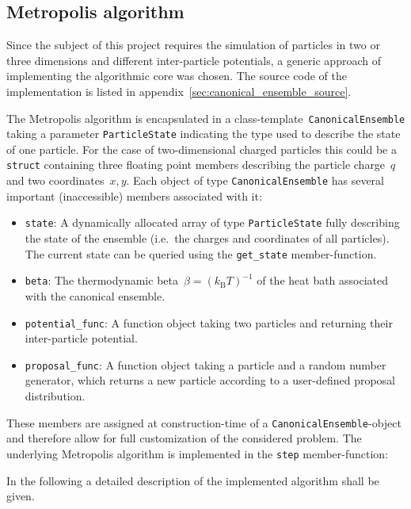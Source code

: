 \documentclass[11pt, a4paper]{article}
\numberwithin{equation}{section}
\begin{document}
\subsection{Metropolis algorithm} \label{sec:Metropolis_alg}
Since the subject of this project requires the simulation of particles in two or three dimensions and different inter-particle potentials, a generic approach of implementing the algorithmic core was chosen.
The source code of the implementation is listed in appendix~\ref{sec:canonical_ensemble_source}.

The Metropolis algorithm is encapsulated in a class-template~\texttt{CanonicalEnsemble} taking a parameter \texttt{ParticleState} indicating the type used to describe the state of one particle.
For the case of two-dimensional charged particles this could be a \texttt{struct} containing three floating point members describing the particle charge~$q$ and two coordinates~$x, y$.
Each object of type \texttt{CanonicalEnsemble} has several important (inaccessible) members associated with it:
\begin{itemize}
	\item \texttt{state}:
		A dynamically allocated array of type \texttt{ParticleState} fully describing the state of the ensemble (i.e.\ the charges and coordinates of all particles).
		The current state can be queried using the \texttt{get\_state} member-function.
	
	\item \texttt{beta}:
		The thermodynamic beta~$\beta = (k_\mathrm{B} T)^{-1}$ of the heat bath associated with the canonical ensemble.
	
	\item \texttt{potential\_func}:
		A function object taking two particles and returning their inter-particle potential.
	
	\item \texttt{proposal\_func}:
		A function object taking a particle and a random number generator, which returns a new particle according to a user-defined proposal distribution.
\end{itemize}
These members are assigned at construction-time of a \texttt{CanonicalEnsemble}-object and therefore allow for full customization of the considered problem.
The underlying Metropolis algorithm is implemented in the \texttt{step} member-function:

In the following a detailed description of the implemented algorithm shall be given.
\end{document}
